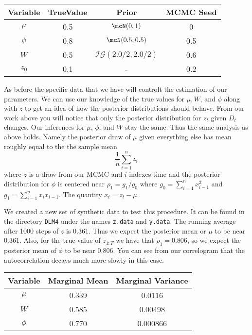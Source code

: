 \documentclass{article}
\begin{document}
\begin{center}
\begin{tabular}{c | c | c | c}
Variable & TrueValue & Prior & MCMC Seed \\
\hline
$\mu$ & 0.5 & $\mcN(0, 1)$ & 0 \\
\hline
$\phi$ & 0.8 & $\mcN(0.5, 0.5)$ & 0.5 \\
\hline
$W$ & 0.5 & $\mathcal{IG}(2.0/2, 2.0/2)$ & 0.6 \\
\hline
$z_0$ & 0.1 & - & 0.2
\end{tabular}
\end{center}

As before the specific data that we have will controlt the estimation of our parameters.  We can use our knowledge of the true values for $\mu, W$, and $\phi$ along with $z$ to get an idea of how the posterior distributions should behave.  From our work above you will notice that only the posterior distribution for $z_t$ given $D_t$ changes.  Our inferences for $\mu$, $\phi$, and $W$ stay the same.  Thus the same analysis as above holds.  Namely the posterior draw of $\mu$ given everything else has mean roughly equal to the the sample mean
\[
\frac{1}{n} \sum_{i=1}^n z_i
\]
where $z$ is a draw from our MCMC and $i$ indexes time and the posterior distribution for $\phi$ is centered near $\rho_1 = g_1/g_0$ where $g_0 = \sum_{i=1}^n x_{i-1}^2$ and $g_1 = \sum_{i-1}^n x_i x_{i-1}$.  The quantity $x_t = z_t - \mu$.

We created a new set of synthetic data to test this procedure.  It can be found in the directory \texttt{DLM4} under the names \texttt{z.data} and \texttt{y.data}.  The running average after 1000 steps of $z$ is 0.361.  Thus we expect the posterior mean or $\mu$ to be near $0.361$.  Also, for the true value of $z_{1:T}$ we have that $\rho_1 = 0.806$, so we expect the posterior mean of $\phi$ to be near $0.806$.  You can see from our correlogram that the autocorrelation decays much more slowly in this case.  

\begin{center}
\begin{tabular}{c | c | c}
Variable & Marginal Mean & Marginal Variance \\
\hline
$\mu$ & 0.339 & 0.0116 \\
$W$ & 0.585 & 0.00498 \\
$\phi$ & 0.770 & 0.000866 \\
\end{tabular}
\end{center}
\end{document}
